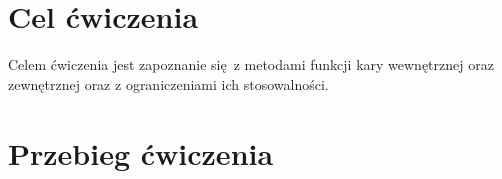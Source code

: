\documentclass[a4paper, 12pt]{article}
\begin{document}
	\noindent
	\section{Cel ćwiczenia}
        Celem ćwiczenia jest zapoznanie się z metodami funkcji kary wewnętrznej oraz zewnętrznej oraz z
        ograniczeniami ich stosowalności.
	\section{Przebieg ćwiczenia}
\end{document}
